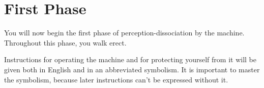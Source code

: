 \vfill
{}
{}{}

\clearpage


\clearpage
{}
\section{First Phase}
You will now begin the first phase of perception-dissociation by the 
machine. Throughout this phase, you walk erect. 

Instructions for operating the machine and for protecting yourself from 
it will be given both in English and in an abbreviated symbolism. It is 
important to master the symbolism, because later instructions can't be 
expressed without it. 

